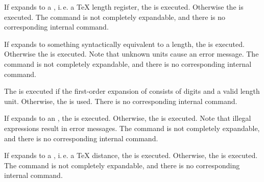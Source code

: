 \begin{Declaration}
\end{Declaration}
If
 expands to a , i.\,e. a \TeX{} length
register, the  is executed. Otherwise the  is executed. The command is not completely expandable, and there
is no corresponding internal command.%
\EndIndexGroup


\begin{Declaration}
\end{Declaration}
If
 expands to something syntactically equivalent to a length,
the  is executed.  Otherwise the  is
executed. Note  that unknown units cause an error
message. The command is not completely expandable, and there is no
corresponding internal command.%
\EndIndexGroup


\begin{Declaration}
\end{Declaration}
The  is executed if
the first-order expansion of  consists of digits and a valid
length unit. Otherwise, the  is used. There is no
corresponding internal command.%
\EndIndexGroup


\begin{Declaration}
\end{Declaration}
If
 expands to an \eTeX{} ,
the  is executed.  Otherwise, the  is
executed. Note  that illegal expressions result in
error messages. The command is not completely expandable, and there is no
corresponding internal command.%
\EndIndexGroup


\begin{Declaration}
\end{Declaration}
If
 expands to a , i.\,e. a \TeX{} distance, the
 is executed. Otherwise, the  is
executed. The command is not completely expandable, and there is no
corresponding internal command.%
\EndIndexGroup


